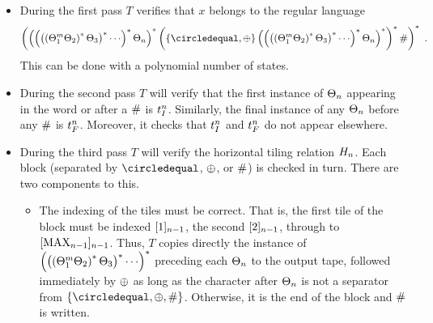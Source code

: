 \begin{itemize}
\item
    During the first pass $T$ verifies that $x$ belongs to the regular language
    \[
        \brac{
            \brac{
                \brac{
                    \brac{
                        \brac{\tilesnum{1}^\linlen \tilesnum{2}}^\ast \tilesnum{3}
                    }^\ast
                    \cdots
                }^\ast
                \tilesnum{\expheight}
            }^\ast
            \brac{
                \set{\numeq,\numplus}
                \brac{
                    \brac{
                        \brac{
                            \brac{\tilesnum{1}^\linlen \tilesnum{2}}^\ast \tilesnum{3}
                        }^\ast
                        \cdots
                    }^\ast
                    \tilesnum{\expheight}
                }^\ast
            }^\ast
            \numsep
         }^\ast
         \ .
    \]
    This can be done with a polynomial number of states.

\item
    During the second pass $T$ will verify that the first instance of
    $\tilesnum{\expheight}$
    appearing in the word or after a $\numsep$ is $\inittilenum{\expheight}$.
    Similarly, the final instance of any
    $\tilesnum{\expheight}$
    before any $\numsep$ is $\fintilenum{\expheight}$.
    Moreover, it checks that
    $\inittilenum{\expheight}$
    and
    $\fintilenum{\expheight}$
    do not appear elsewhere.

\item
    During the third pass $T$ will verify the horizontal tiling relation
    $\hrelnum{\expheight}$.
    Each block (separated by $\numeq$, $\numplus$, or $\numsep$) is checked in turn.
    There are two components to this.
    \begin{itemize}
    \item
        The indexing of the tiles must be correct.
        That is, the first tile of the block must be indexed
        $\tenc{\expheight-1}{1}$,
        the second
        $\tenc{\expheight-1}{2}$,
        through to
        $\tenc{\expheight-1}{\nmax{\expheight-1}}$.
        Thus, $T$ copies directly the instance of
        $\brac{
            \brac{
                \brac{\tilesnum{1}^\linlen \tilesnum{2}}^\ast \tilesnum{3}
            }^\ast
            \cdots
        }^\ast$
        preceding each
        $\tilesnum{\expheight}$
        to the output tape, followed immediately by
        $\numplus$
        as long as the character after
        $\tilesnum{\expheight}$
        is not a separator from
        $\set{\numeq,\numplus,\numsep}$.
        Otherwise, it is the end of the block and $\numsep$ is written.


\end{itemize}
\end{itemize}
